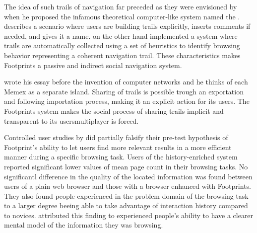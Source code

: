 The idea of such trails of navigation far preceded \citeauthor{wexelblat99}
as they were envisioned by \citet{bush45} when he proposed the infamous
theoretical computer-like system named the .%
\citeauthor{bush45} describes a scenario where users are building trails
explicitly, inserts comments if needed, and gives it a name.
\citeauthor{wexelblat99} on the other hand
implemented a system where trails are automatically collected using a set of
heuristics to identify browsing behavior representing a coherent navigation
trail. These characteristics makes Footprints a passive and indirect social
navigation system.

\citeauthor{bush45} wrote his essay before the invention of computer networks
and he thinks of each Memex as a separate island. Sharing of trails is
possible trough an exportation and following importation process, making it an
explicit action for its users.
The Footprints system makes the social process of sharing trails implicit and
transparent to its users\dash{}multiplayer is forced.

Controlled user studies by \citeauthor{wexelblat99} did partially falsify
their pre-test hypothesis of Footprint's ability to let users find more
relevant results in a more efficient manner during a specific browsing task.
Users of the history-enriched system reported significant lower values of mean
page count in their browsing tasks. No significantl difference in the quality
of the located information was found between users of a
plain web browser and those with a browser enhanced with Footprints.
They also found people experienced in the problem domain of the browsing task
to a larger degree beeing able to take advantage of interaction history
compared to novices.
\citeauthor{wexelblat99} attributed this finding to experienced people's
ability to have a clearer mental model of the information they was browsing.

